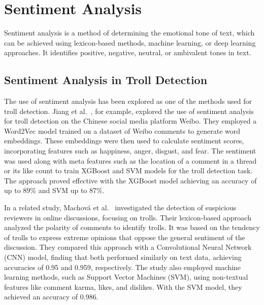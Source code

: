 \documentclass[twoside]{ctuthesis}
\theoremstyle{plain}
\theoremstyle{definition}
\theoremstyle{note}
\begin{document}
\section{Sentiment Analysis}
Sentiment analysis is a method of determining the emotional tone of text, which can be achieved using lexicon-based methods, machine learning, or deep learning approaches. It identifies positive, negative, neutral, or ambivalent tones in text.\par

\subsection{Sentiment Analysis in Troll Detection}
The use of sentiment analysis has been explored as one of the methods used for troll detection. Jiang et al.~\cite{Jiang2021Sentiment}, for example, explored the use of sentiment analysis for troll detection on the Chinese social media platform Weibo. They employed a Word2Vec model trained on a dataset of Weibo comments to generate word embeddings. These embeddings were then used to calculate sentiment scores, incorporating features such as happiness, anger, disgust, and fear. The sentiment was used along with meta features such as the location of a comment in a thread or its like count to train XGBoost and SVM models for the troll detection task. The approach proved effective with the XGBoost model achieving an accuracy of up to 89\% and SVM up to 87\%.\par
In a related study, Machová et al.~\cite{Machova2022Comparison} investigated the detection of suspicious reviewers in online discussions, focusing on trolls. Their lexicon-based approach analyzed the polarity of comments to identify trolls. It was based on the tendency of trolls to express extreme opinions that oppose the general sentiment of the discussion. They compared this approach with a Convolutional Neural Network (CNN) model, finding that both performed similarly on text data, achieving accuracies of 0.95 and 0.959, respectively. The study also employed machine learning methods, such as Support Vector Machines (SVM), using non-textual features like comment karma, likes, and dislikes. With the SVM model, they achieved an accuracy of 0.986.\par 

\end{document}
